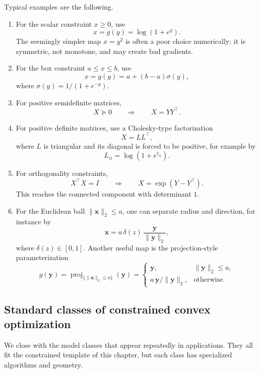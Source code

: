 Typical examples are the following.
\begin{enumerate}
  \item For the scalar constraint $x\ge 0$, use
  \[
    x = g(y) = \log(1+e^y).
  \]
  The seemingly simpler map $x=y^2$ is often a
  poor choice numerically: it is symmetric, not monotone, and may create bad
  gradients.

  \item For the box constraint $a\le x\le b$, use
  \[
    x = g(y) = a + (b-a)\sigma(y),
  \]
  where $\sigma(y)=1/(1+e^{-y})$. 

  \item For positive semidefinite matrices,
  \[
    X \succeq 0
    \qquad \Longrightarrow \qquad
    X = Y Y^\top.
  \]

  \item For positive definite matrices, use a Cholesky-type factorization
  \[
    X = L L^\top,
  \]
  where $L$ is triangular and its diagonal is forced to be positive, for
  example by
  \[
    L_{ii} = \log(1+e^{\ell_{ii}}).
  \]

  \item For orthogonality constraints,
  \[
    X^\top X = I
    \qquad \Longrightarrow \qquad
    X = \exp(Y-Y^\top).
  \]
  This reaches the connected component with determinant $1$.

  \item For the Euclidean ball $\|\mathbf{x}\|_2\le a$, one can separate radius
  and direction, for instance by
  \[
    \mathbf{x}
    =
    a\,\delta(z)\,
    \frac{\mathbf{y}}{\|\mathbf{y}\|_2},
  \]
  where $\delta(z)\in [0,1]$. Another useful map is the
  projection-style parameterization
  \[
    g(\mathbf{y})
    =
    \operatorname{proj}_{\{\|\mathbf{u}\|_2\le a\}}(\mathbf{y})
    =
    \begin{cases}
      \mathbf{y}, & \|\mathbf{y}\|_2\le a, \\
      a\,\mathbf{y}/\|\mathbf{y}\|_2, & \text{otherwise}.
    \end{cases}
  \]
\end{enumerate}

\subsection{Standard classes of constrained convex optimization}
\label{subsec:ch8-standard-classes}
We close with the model classes that appear repeatedly in
applications. They all fit the constrained template of this chapter, but each
class has specialized algorithms and geometry.


